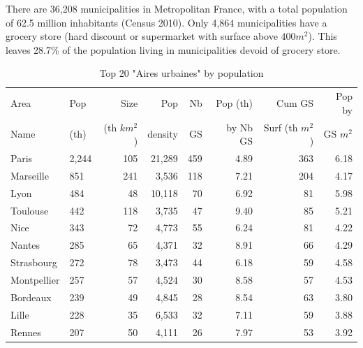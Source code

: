 \documentclass[11pt]{article}
\begin{document}
There are 36,208 municipalities in Metropolitan France, with a total population of 62.5 million inhabitants (Census 2010). Only 4,864 municipalities have a grocery store (hard discount or supermarket with surface above $400m^2$). This leaves 28.7\% of the population living in municipalities devoid of grocery store.

\begin{table}[H]
\caption{Top 20 "Aires urbaines" by population}
\small
\renewcommand{\arraystretch}{0.7}%

\begin{tabular}{llrrrrrr}
\toprule
Area             &      Pop   &   Size     &  Pop       & Nb         &  Pop (th)  & Cum GS          & Pop by   \\
Name             &      (th)  & (th $km^2$)&  density   & GS         &  by Nb GS  & Surf (th $m^2$) & GS $m^2$ \\
\midrule
         Paris &      2,244 &        105 &       21,289 &        459 &       4.89 &        363 &        6.18 \\
     Marseille &        851 &        241 &        3,536 &        118 &       7.21 &        204 &        4.17 \\
          Lyon &        484 &         48 &       10,118 &         70 &       6.92 &         81 &        5.98 \\
      Toulouse &        442 &        118 &        3,735 &         47 &       9.40 &         85 &        5.21 \\
          Nice &        343 &         72 &        4,773 &         55 &       6.24 &         81 &        4.22 \\
        Nantes &        285 &         65 &        4,371 &         32 &       8.91 &         66 &        4.29 \\
    Strasbourg &        272 &         78 &        3,473 &         44 &       6.18 &         59 &        4.58 \\
   Montpellier &        257 &         57 &        4,524 &         30 &       8.58 &         57 &        4.53 \\
      Bordeaux &        239 &         49 &        4,845 &         28 &       8.54 &         63 &        3.80 \\
         Lille &        228 &         35 &        6,533 &         32 &       7.11 &         59 &        3.88 \\
        Rennes &        207 &         50 &        4,111 &         26 &       7.97 &         53 &        3.92 \\

\end{tabular}
\end{table}
\end{document}
